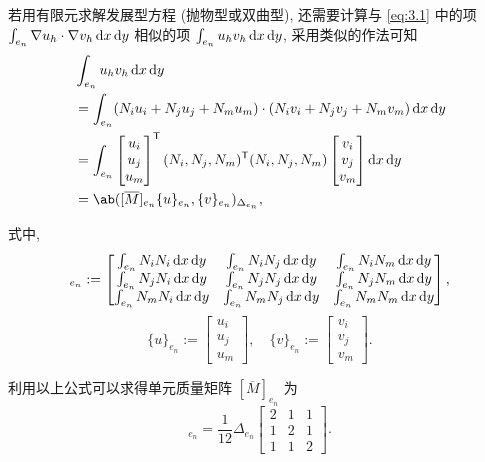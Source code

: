 \begin{note}
若用有限元求解发展型方程 (抛物型或双曲型), 还需要计算与 \eqref{eq:3.1} 中的项 $\int_{e_n} \nabla
u_h \cdot \nabla v_h \mathop{}\!\mathrm{d} x\mathop{}\!\mathrm{d} y$ 相似的项 $\int_{e_n} u_h v_h \mathop{}\!\mathrm{d} x\mathop{}\!\mathrm{d} y$, 采用类似的作法可知
\begin{align*}
&\int_{e_n} u_h v_h \d x\d y \\
&= \int_{e_n} (N_i u_i + N_j u_j + N_m u_m) \cdot (N_i v_i + N_j v_j + N_m v_m) \d x\d y \\
&= \int_{e_n} \begin{bmatrix} u_i \\ u_j \\ u_m \end{bmatrix}^{\mathsf{T}} (N_i, N_j,
N_m)^{\mathsf{T}} (N_i, N_j, N_m) \begin{bmatrix} v_i \\ v_j \\ v_m \end{bmatrix} \d x\d y \\
&= \ab([\overline{M}]_{e_n} \{u\}_{e_n}, \{v\}_{e_n})_{\Delta_{e_n}},
\end{align*}
\end{note}

式中,
\begin{equation*}
[\overline{M}]_{e_n} := \begin{bmatrix}
\int_{e_n} N_i N_i \d x\d y & \int_{e_n} N_i N_j \d x\d y & \int_{e_n} N_i N_m \d x\d y \\
\int_{e_n} N_j N_i \d x\d y & \int_{e_n} N_j N_j \d x\d y & \int_{e_n} N_j N_m \d x\d y \\
\int_{e_n} N_m N_i \d x\d y & \int_{e_n} N_m N_j \d x\d y & \int_{e_n} N_m N_m \d x\d y
\end{bmatrix},
\end{equation*}
\begin{equation*}
\{u\}_{e_n} := \begin{bmatrix} u_i \\ u_j \\ u_m \end{bmatrix}, \quad \{v\}_{e_n} :=
\begin{bmatrix} v_i \\ v_j \\ v_m \end{bmatrix}.
\end{equation*}

利用以上公式可以求得单元质量矩阵 $[\overline{M}]_{e_n}$ 为
\begin{equation*}
[\overline{M}]_{e_n} = \frac{1}{12}\Delta_{e_n} \begin{bmatrix} 2 & 1 & 1 \\ 1 & 2 & 1 \\ 1 & 1 &
 2 \end{bmatrix}.
\end{equation*}

